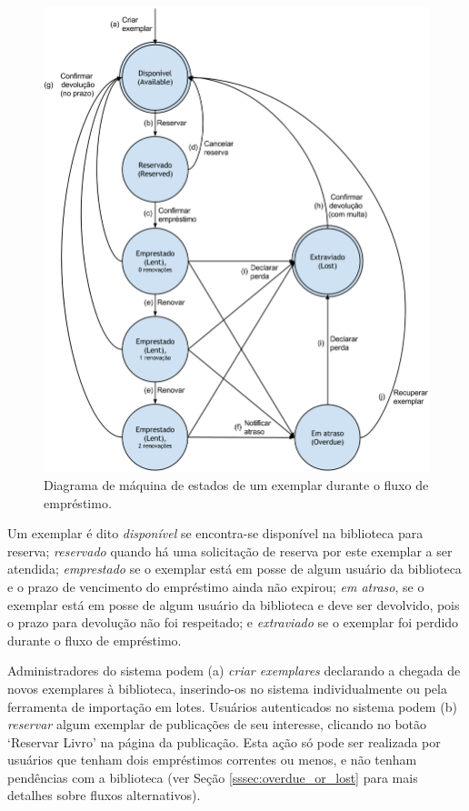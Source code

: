 \documentclass[a4paper]{article}
\begin{document}
\begin{figure}[pbth!]
\centering
\includegraphics[width=140mm]{img/workflow.png}
\caption{Diagrama de máquina de estados de um exemplar durante o fluxo de empréstimo.\label{workflow}}
\end{figure}

Um exemplar é dito \textit{disponível} se encontra-se disponível na biblioteca para reserva; \textit{reservado} quando há uma solicitação de reserva por este exemplar a ser atendida; \textit{emprestado} se o exemplar está em posse de algum usuário da biblioteca e o prazo de vencimento do empréstimo ainda não expirou; \textit{em atraso}, se o exemplar está em posse de algum usuário da biblioteca e deve ser devolvido, pois o prazo para devolução não foi respeitado; e \textit{extraviado} se o exemplar foi perdido durante o fluxo de empréstimo.

Administradores do sistema podem (a) \textit{criar exemplares} declarando a chegada de novos exemplares à biblioteca, inserindo-os no sistema individualmente ou pela ferramenta de importação em lotes. Usuários autenticados no sistema podem (b) \textit{reservar} algum exemplar de publicações de seu interesse, clicando no botão ‘Reservar Livro’ na página da publicação. Esta ação só pode ser realizada por usuários que tenham dois empréstimos correntes ou menos, e não tenham pendências com a biblioteca (ver Seção \ref{sssec:overdue_or_lost} para mais detalhes sobre fluxos alternativos).
\end{document}
